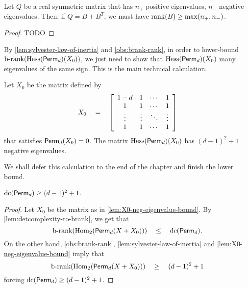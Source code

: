 \begin{lemma}\label{lem:sylvester-law-of-inertia} Let $Q$ be a real symmetric matrix that has $n_+$ positive eigenvalues, $n_-$ negative eigenvalues. Then, if $Q = B + B^T$, we must have $\mathrm{rank}(B) \geq \max(n_+, n_-)$. 
\end{lemma}
\begin{proof}
TODO
\end{proof}

By \autoref{lem:sylvester-law-of-inertia} and \autoref{obs:brank-rank}, in order to lower-bound $\text{b-rank}(\mathrm{Hess}(\mathsf{Perm}_d)(X_0))$, we just need to show that $\mathrm{Hess}(\mathsf{Perm}_d)(X_0)$ many eigenvalues of the same sign. This is the main technical calculation. 

\begin{lemma}\label{lem:X0-neg-eigenvalue-bound}
Let $X_0$ be the matrix defined by 
\[
X_0 \quad = \quad \left[\begin{array}{cccc}
1-d & 1 & \cdots & 1\\
1 & 1 & \cdots & 1\\
\vdots & \vdots & \ddots & \vdots\\
1 & 1 & \cdots & 1
\end{array}\right]
\]
that satisfies $\mathsf{Perm}_d(X_0) = 0$. The matrix $\mathrm{Hess}(\mathsf{Perm}_d)(X_0)$ has $(d-1)^2 + 1$ negative eigenvalues. 
\end{lemma}

\noindent 
We shall defer this calculation to the end of the chapter and finish the lower bound. 

\begin{theorem}\label{thm:dc-comp-yabe}
$\mathrm{dc}(\mathsf{Perm}_d) \geq (d-1)^2 + 1$. 
\end{theorem}
\begin{proof}
Let $X_0$ be the matrix as in \autoref{lem:X0-neg-eigenvalue-bound}. By \autoref{lem:detcomplexity-to-brank}, we get that
\[
\text{b-rank}(\mathrm{Hom}_2(\mathsf{Perm}_d(X + X_0))) \quad \leq \quad \mathrm{dc}(\mathsf{Perm}_d). 
\]
On the other hand, \autoref{obs:brank-rank}, \autoref{lem:sylvester-law-of-inertia} and  \autoref{lem:X0-neg-eigenvalue-bound} imply that 
\[
\text{b-rank}(\mathrm{Hom}_2(\mathsf{Perm}_d(X + X_0))) \quad \geq \quad (d-1)^2 + 1
\]
forcing $\mathrm{dc}(\mathsf{Perm}_d) \geq (d-1)^2 + 1$. 
\end{proof}


